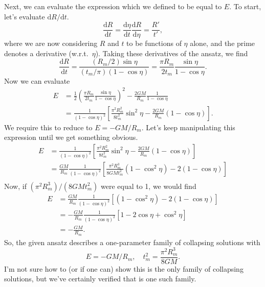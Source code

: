 \documentclass{article}
\renewcommand{\d}{\mathrm{d}}
\begin{document}
Next, we can evaluate the expression which we defined to be equal to $E$. To
start, let's evaluate $\d R/\d t$.
\begin{equation}
	\frac{\d R}{\d t}
	= \frac{\d \eta}{\d t} \frac{\d R}{\d \eta}
	= \frac{R'}{t'},
\end{equation}
where we are now considering $R$ and $t$ to be functions of $\eta$ alone, and
the prime denotes a derivative (w.r.t.~$\eta$). Taking these derivatives of the
ansatz, we find
\begin{equation}
	\frac{\d R}{\d t}
	= \frac{(R_m/2) \sin\eta}{(t_m/\pi) (1 - \cos\eta)}
	= \frac{\pi R_m}{2 t_m} \frac{\sin \eta}{1 - \cos\eta}.
\end{equation}
Now we can evaluate
\begin{equation}
\begin{aligned}
	E
	&= \frac{1}{2} \left(
		\frac{\pi R_m}{2 t_m} \frac{\sin \eta}{1 - \cos\eta}
	\right)^2 - \frac{2GM}{R_m} \frac{1}{1 - \cos\eta} \\
	&= \frac{1}{(1 - \cos\eta)^2} \left[
		\frac{\pi^2 R_m^2}{8 t_m^2} \sin^2 \eta
		- \frac{2 G M}{R_m} (1 - \cos \eta)
	\right].
\end{aligned}
\end{equation}
We require this to reduce to $E = -G M / R_m$. Let's keep manipulating this
expression until we get something obvious.
\begin{equation}
\begin{aligned}
	E
	&= \frac{1}{(1 - \cos\eta)^2} \left[
		\frac{\pi^2 R_m^2}{8 t_m^2} \sin^2 \eta
		- \frac{2 G M}{R_m} (1 - \cos \eta)
	\right] \\
	&= \frac{G M}{R_m} \frac{1}{(1 - \cos\eta)^2} \left[
		\frac{\pi^2 R_m^3}{8 G M t_m^2} (1 - \cos^2 \eta)
		- 2 (1 - \cos \eta)
	\right] \\
\end{aligned}
\end{equation}
Now, if $(\pi^2 R_m^3)/(8 G M t_m^2)$ were equal to 1, we would find
\begin{equation}
\begin{aligned}
	E
	&= \frac{G M}{R_m} \frac{1}{(1 - \cos\eta)^2} \left[
		(1 - \cos^2 \eta) - 2 (1 - \cos \eta)
	\right] \\
	&= -\frac{G M}{R_m} \frac{1}{(1 - \cos\eta)^2} \left[
		1 - 2 \cos \eta + \cos^2 \eta
	\right] \\
	&= -\frac{G M}{R_m}.
\end{aligned}
\end{equation}
So, the given ansatz describes a one-parameter family of collapsing solutions with
\begin{equation}
	E = - GM/R_m, \quad t_m^2 = \frac{\pi^2 R_m^3}{8 G M}.
\end{equation}
I'm not sure how to (or if one can) show this is the only family of collapsing
solutions, but we've certainly verified that is one such family.
\end{document}
